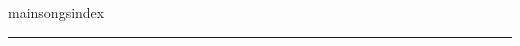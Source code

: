 ﻿%


\begin{songs}{mainsongsindex}















\end{songs}


% 

% 




\vfill
\hfill
\hrule
\hfill
\newline
\newline




